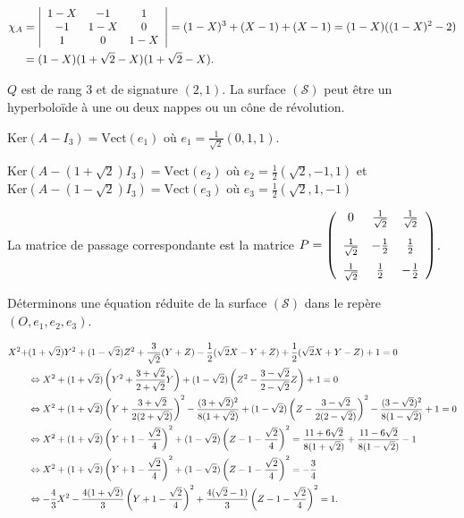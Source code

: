 {\begin{enumerate}
{\begin{align*}\ensuremath
\chi_A&=\left|
\begin{array}{ccc}
1-X&-1&1\\
-1&1-X&0\\
1&0&1-X
\end{array}
\right|= (1-X)^3+(X-1)+(X-1) = (1-X)((1-X)^2 - 2)\\
 &= (1-X)(1+\sqrt{2}-X)(1+\sqrt{2}-X).
\end{align*}

$Q$ est de rang $3$ et de signature $(2,1)$. La surface $(\mathcal{S})$ peut être un hyperboloïde à une ou deux nappes ou un cône de révolution.

$\text{Ker}(A-I_3) =\text{Vect}(e_1)$ où $e_1=\frac{1}{\sqrt{2}}(0,1,1)$.
  

$\text{Ker}(A-(1+\sqrt{2})I_3)=\text{Vect}(e_2)$ où $e_2=\frac{1}{2}(\sqrt{2},-1,1)$ et  $\text{Ker}(A-(1-\sqrt{2})I_3)=\text{Vect}(e_3)$ où $e_3=\frac{1}{2}(\sqrt{2},1,-1)$

 
La matrice de passage correspondante est la matrice $P=\left(
\begin{array}{ccc}
0&\frac{1}{\sqrt{2}}&\frac{1}{\sqrt{2}}\\
\rule[-4mm]{0mm}{10mm}\frac{1}{\sqrt{2}}&-\frac{1}{2}&\frac{1}{2}\\
\frac{1}{\sqrt{2}}&\frac{1}{2}&-\frac{1}{2}
\end{array}
\right)$.

Déterminons une équation réduite de la surface $(\mathcal{S})$ dans le repère $(O,e_1,e_2,e_3)$.

\begin{align*}\ensuremath
X^2+&(1+\sqrt{2})Y^2+(1-\sqrt{2})Z^2+\frac{3}{\sqrt{2}}(Y+Z)-\frac{1}{2}(\sqrt{2}X-Y+Z)+\frac{1}{2}(\sqrt{2}X+Y-Z)+1 = 0\\
 &\Leftrightarrow X^2+(1+\sqrt{2})\left(Y^2+\frac{3+\sqrt{2}}{2+\sqrt{2}}Y\right)+(1-\sqrt{2})\left(Z^2-\frac{3-\sqrt{2}}{2-\sqrt{2}}Z\right)+1 = 0\\
 &\Leftrightarrow X^2+(1+\sqrt{2})\left(Y+\frac{3+\sqrt{2}}{2(2+\sqrt{2})}\right)^2-\frac{(3+\sqrt{2})^2}{8(1+\sqrt{2})}+(1-\sqrt{2})\left(Z-\frac{3-\sqrt{2}}{2(2-\sqrt{2})}\right)^2-\frac{(3-\sqrt{2})^2}{8(1-\sqrt{2})}+1 = 0\\
 &\Leftrightarrow X^2+(1+\sqrt{2})\left(Y+1-\frac{\sqrt{2}}{4}\right)^2+(1-\sqrt{2})\left(Z-1-\frac{\sqrt{2}}{4}\right)^2 =\frac{11+6\sqrt{2}}{8(1+\sqrt{2})}+\frac{11-6\sqrt{2}}{8(1-\sqrt{2})}-1\\
 &\Leftrightarrow X^2+(1+\sqrt{2})\left(Y+1-\frac{\sqrt{2}}{4}\right)^2+(1-\sqrt{2})\left(Z-1-\frac{\sqrt{2}}{4}\right)^2 =-\frac{3}{4}\\
  &\Leftrightarrow-\frac{4}{3}X^2-\frac{4(1+\sqrt{2})}{3}\left(Y+1-\frac{\sqrt{2}}{4}\right)^2+\frac{4(\sqrt{2}-1)}{3}\left(Z-1-\frac{\sqrt{2}}{4}\right)^2 =1.
\end{align*}

}
\end{enumerate}}
